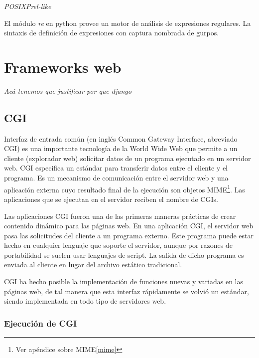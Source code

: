 \documentclass[a4paper]{report}
\begin{document}
\emph{POSIX}\emph{Prel-like}

El módulo \emph{re} en python provee un motor de análisis de expresiones regulares.
La sintaxis de definición de expresiones con captura nombrada de gurpos.



\section{Frameworks web}
\emph{Acá tenemos que justificar por que django}
\subsection{CGI}
Interfaz de entrada común (en inglés Common Gateway Interface, abreviado CGI) es
una importante tecnología de la World Wide Web que permite a un cliente
(explorador web) solicitar datos de un programa ejecutado en un servidor web.
CGI especifica un estándar para transferir datos entre el cliente y el programa.
Es un mecanismo de comunicación entre el servidor web y una aplicación externa
cuyo resultado final de la ejecución son objetos MIME\footnote{Ver apéndice sobre MIME\ref{mime}}.
Las aplicaciones que se ejecutan en el servidor reciben el nombre de CGIs.


Las aplicaciones CGI fueron una de las primeras maneras prácticas de crear
contenido dinámico para las páginas web. En una aplicación CGI, el servidor web
pasa las solicitudes del cliente a un programa externo. Este programa puede
estar hecho en cualquier lenguaje que soporte el servidor, aunque por razones de
portabilidad se suelen usar lenguajes de script. La salida de dicho programa es
enviada al cliente en lugar del archivo estático tradicional.

CGI ha hecho posible la implementación de funciones nuevas y variadas en las
páginas web, de tal manera que esta interfaz rápidamente se volvió un estándar,
siendo implementada en todo tipo de servidores web.
\subsubsection*{Ejecución de CGI}
\end{document}
